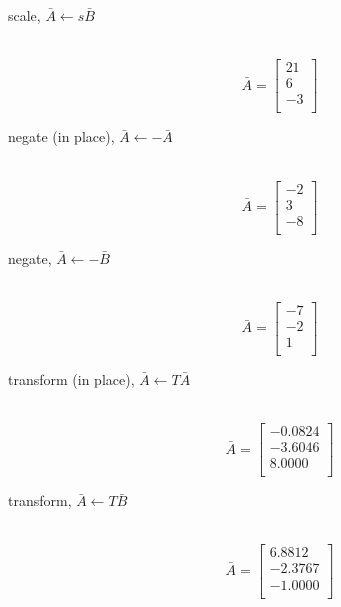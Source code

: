 \begin{description}
  \item[scale, $\bar{A} \leftarrow s\bar{B}$]\ \newline
   \begin{equation}\nonumber
   \bar{A} = \left[
   \begin{array}{r}
      21  \\
       6  \\
      -3  \\
   \end{array}\right]
   \end{equation}

  \item[negate (in place), $\bar{A} \leftarrow -\bar{A}$]\ \newline
   \begin{equation}\nonumber
   \bar{A} = \left[
   \begin{array}{r}
      -2  \\
       3  \\
      -8  \\
   \end{array}\right]
   \end{equation}

  \item[negate, $\bar{A} \leftarrow  -\bar{B}$]\ \newline
   \begin{equation}\nonumber
   \bar{A} = \left[
   \begin{array}{r}
      -7  \\
      -2  \\
       1  \\
   \end{array}\right]
   \end{equation}

  \item[transform (in place), $\bar{A} \leftarrow T\bar{A}$]\ \newline
   \begin{equation}\nonumber
   \bar{A} = \left[
   \begin{array}{r}
      -0.0824  \\
      -3.6046  \\
       8.0000  \\
   \end{array}\right]
   \end{equation}

  \item[transform, $\bar{A} \leftarrow T\bar{B}$]\ \newline
   \begin{equation}\nonumber
   \bar{A} = \left[
   \begin{array}{r}
       6.8812  \\
      -2.3767  \\
      -1.0000  \\
   \end{array}\right]
   \end{equation}


\end{description}
